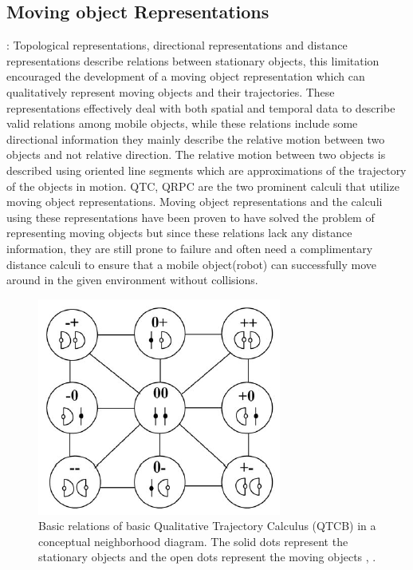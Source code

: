 		
		\subsection{Moving object Representations} \cite{chen2015survey} : Topological representations, directional representations
		 and distance representations describe relations between stationary objects, this limitation encouraged the development of a moving object representation which can qualitatively represent moving objects and their trajectories. These representations effectively deal with both spatial and temporal data to describe valid relations among mobile objects, while these relations include some directional information they mainly describe the relative motion between two objects and not relative direction. The relative motion between two objects is described using oriented line segments which are approximations of the trajectory of the objects in motion. QTC, QRPC are the two prominent calculi that utilize moving object representations. Moving object representations and the calculi using these representations have been proven to have solved the problem of representing moving objects but since these relations lack any distance information, they are still prone to failure and often need a complimentary distance calculi to ensure that a mobile object(robot) can successfully move around in the given environment without collisions.
		
		\begin{figure}[h]
			\centering
			\includegraphics[scale=1]{images/qtcb}
			\caption{Basic relations of basic Qualitative Trajectory Calculus (QTCB) in a conceptual neighborhood diagram. The solid dots represent the stationary objects and the open dots represent the moving objects \cite{bibid}, \cite{de_weghe}.}
			\label{fig:qtcb}
		\end{figure}		
		
